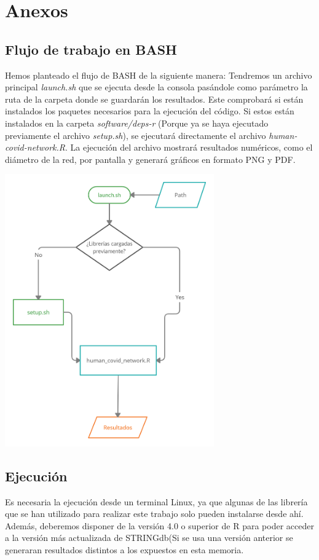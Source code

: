 \section{Anexos}

\subsection{Flujo de trabajo en BASH}

Hemos planteado el flujo de BASH de la siguiente manera:
Tendremos un archivo principal \textit{launch.sh} que se ejecuta desde la consola pasándole como parámetro la ruta de la carpeta donde se guardarán los resultados. Este comprobará si están instalados los paquetes necesarios para la ejecución del código. Si estos están instalados en la carpeta \textit{software/deps-r} (Porque ya se haya ejecutado previamente el archivo \textit{setup.sh}), se ejecutará directamente el archivo \textit{human-covid-network.R}. La ejecución del archivo mostrará resultados numéricos, como el diámetro de la red, por pantalla y generará gráficos en formato PNG y PDF. 

\begin{center}

\includegraphics[width=90mm,scale=1]{report/figures/flujo.PNG}

\end{center}

\subsection{Ejecución}
Es necesaria la ejecución desde un terminal Linux, ya que algunas de las librería que se han utilizado para realizar este trabajo solo pueden instalarse desde ahí.
Además, deberemos disponer de la versión 4.0 o superior de R para poder acceder a la versión más actualizada de STRINGdb(Si se usa una versión anterior se generaran resultados distintos a los expuestos en esta memoria.
